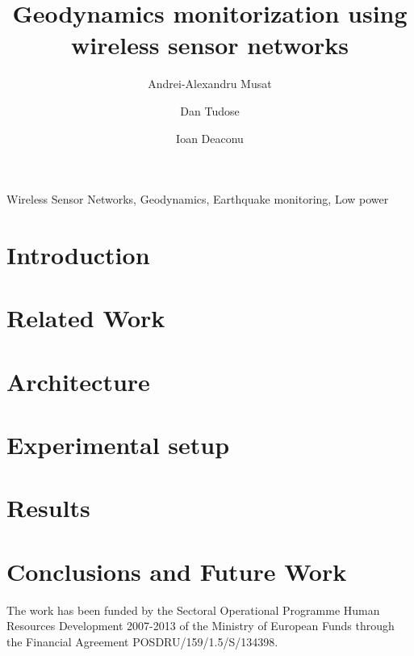 \documentclass{ifacconf}
\begin{document}
\begin{frontmatter}

\title{Geodynamics monitorization using wireless sensor networks}

\author[First]{Andrei-Alexandru Musat}
\author[Second]{Dan Tudose}
\author[Third]{Ioan Deaconu} 

\address[First]{University Politehnica of Bucharest, 
   Bucharest, Romania (e-mail: andrei.musat@cti.pub.ro).}
\address[Second]{University Politehnica of Bucharest, 
   Bucharest, Romania (e-mail: dan.tudose@cs.pub.ro).}
\address[Third]{University Politehnica of Bucharest, 
   Bucharest, Romania (e-mail: ioan.deaconu@cti.pub.ro).}

\begin{abstract} 

\end{abstract}

\begin{keyword}
Wireless Sensor Networks, Geodynamics, Earthquake monitoring, Low power
\end{keyword}

\end{frontmatter}


\section{Introduction}
\label{sec:introduction}


\section{Related Work}
\label{sec:related}


\section{Architecture}
\label{sec:architecture}


\section{Experimental setup}
\label{sec:experimental}


\section{Results}
\label{sec:results}


\section{Conclusions and Future Work}
\label{sec:conclusion}


\begin{ack}
The work has been funded by the Sectoral Operational Programme Human Resources Development 2007-2013 of the Ministry of European Funds through the Financial Agreement POSDRU/159/1.5/S/134398.
\end{ack}


\end{document}
